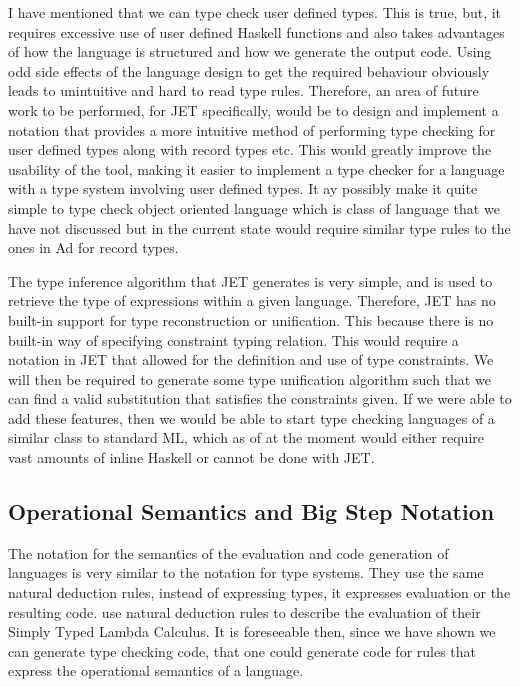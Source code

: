 I have mentioned that we can type check user defined types.
This is true, but, it requires excessive use of user defined Haskell functions and also takes advantages of how the language is structured and how we generate the output code.
Using odd side effects of the language design to get the required behaviour obviously leads to unintuitive and hard to read type rules.
Therefore, an area of future work to be performed, for JET specifically, would be to design and implement a notation that provides a more intuitive method of performing type checking for user defined types along with record types etc.
This would greatly improve the usability of the tool, making it easier to implement a type checker for a language with a type system involving user defined types.
It ay possibly make it quite simple to type check object oriented language which is class of language that we have not discussed but in the current state would require similar type rules to the ones in Ad for record types.

The type inference algorithm that JET generates is very simple, and is used to retrieve the type of expressions within a given language.
Therefore, JET has no built-in support for type reconstruction or unification\cite{pierce2002types,cardelli1996type}.
This because there is no built-in way of specifying constraint typing relation\cite{pierce2002types}.
This would require a notation in JET that allowed for the definition and use of type constraints.
We will then be required to generate some type unification algorithm such that we can find a valid substitution that satisfies the constraints given. 
If we were able to add these features, then we would be able to start type checking languages of a similar class to standard ML\cite{milner1997definition}, which as of at the moment would either require vast amounts of inline Haskell or cannot be done with JET.

\subsection{Operational Semantics and Big Step Notation}
The notation for the semantics of the evaluation and code generation of languages is very similar to the notation for type systems.
They use the same natural deduction rules, instead of expressing types, it expresses evaluation or the resulting code.
\textcite{pierce2002types} use natural deduction rules to describe the evaluation of their Simply Typed Lambda Calculus.
It is foreseeable then, since we have shown we can generate type checking code, that one could generate code for rules that express the operational semantics of a language.

